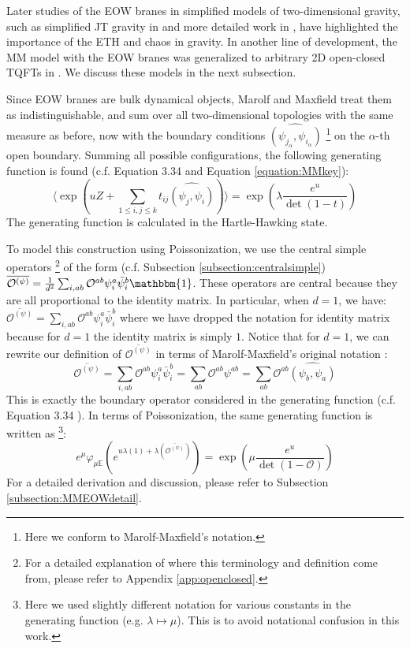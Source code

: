 \documentclass[a4paper,11pt]{article}
\theoremstyle{definition}
\numberwithin{equation}{section}
\newcommand{\lb}{\left(}
\newcommand{\rb}{\right)}
\begin{document}
Later studies of the EOW branes in simplified models of two-dimensional gravity, such as simplified JT gravity in \cite{Penington:2019kki} and more detailed work in \cite{jafferis2023jackiw,jafferis2023matrix}, have highlighted the importance of the ETH and chaos in gravity. In another line of development, the MM model with the EOW branes was generalized to arbitrary 2D open-closed TQFTs in \cite{gardiner20212D,banerjee2022comments}. We discuss these models in the next subsection.

Since EOW branes are bulk dynamical objects, Marolf and Maxfield treat them as indistinguishable, and sum over all two-dimensional topologies with the same measure as before, now with the boundary conditions $\widehat{(\psi_{j_\alpha}, \psi_{i_\alpha})}$ \footnote{Here we conform to Marolf-Maxfield's notation.} on the $\alpha$-th open boundary. Summing all possible configurations, the following generating function is found (c.f. Equation 3.34 \cite{MM} and Equation \ref{equation:MMkey}):
\begin{equation}
    \langle\exp\lb uZ + \sum_{1\leq i,j\leq k}t_{ij}\widehat{(\psi_j,\psi_i)}\rb\rangle = \exp(\lambda\frac{e^u}{\det(1 - t)})
\end{equation}
The generating function is calculated in the Hartle-Hawking state.

To model this construction using Poissonization, we use the central simple operators \footnote{For a detailed explanation of where this terminology and definition come from, please refer to Appendix \ref{app:openclosed}.} of the form (c.f. Subsection \ref{subsection:centralsimple}) $\overline{\mathcal{O}^{(\psi)}} = \frac{1}{d^2}\sum_{i,ab}\mathcal{O}^{ab}\psi^a_i\bar{\psi}^b_i\mathbbm{1}$. These operators are central because they are all proportional to the identity matrix. In particular, when $d = 1$, we have: $\overline{\mathcal{O}^{(\psi)}} = \sum_{i,ab}\mathcal{O}^{ab}\psi^a_i\bar{\psi}^b_i$ where we have dropped the notation for identity matrix because for $d = 1$ the identity matrix is simply $1$. Notice that for $d = 1$, we can rewrite our definition of $\overline{\mathcal{O}^{(\psi)}}$ in terms of Marolf-Maxfield's original notation \cite{MM}:
\begin{equation}
    \overline{\mathcal{O}^{(\psi)}} = \sum_{i,ab}\mathcal{O}^{ab}\psi^a_i\bar{\psi}^b_i = \sum_{ab}\mathcal{O}^{ab}\psi^{ab} = \sum_{ab}\mathcal{O}^{ab}\widehat{(\psi_b, \psi_a)}
\end{equation}
This is exactly the boundary operator considered in the generating function (c.f. Equation 3.34 \cite{MM}). In terms of Poissonization, the same generating function is written as \footnote{Here we used slightly different notation for various constants in the generating function (e.g. $\lambda\mapsto\mu$). This is to avoid notational confusion in this work.}:
\begin{equation}
    e^\mu\varphi_{\mu\mathbb{E}}\lb e^{u\lambda(1) + \lambda(\overline{\mathcal{O}^{(\psi)}})} \rb = \exp(\mu\frac{e^u}{\det(1 - \mathcal{O})})
\end{equation}
For a detailed derivation and discussion, please refer to Subsection \ref{subsection:MMEOWdetail}.
\end{document}
